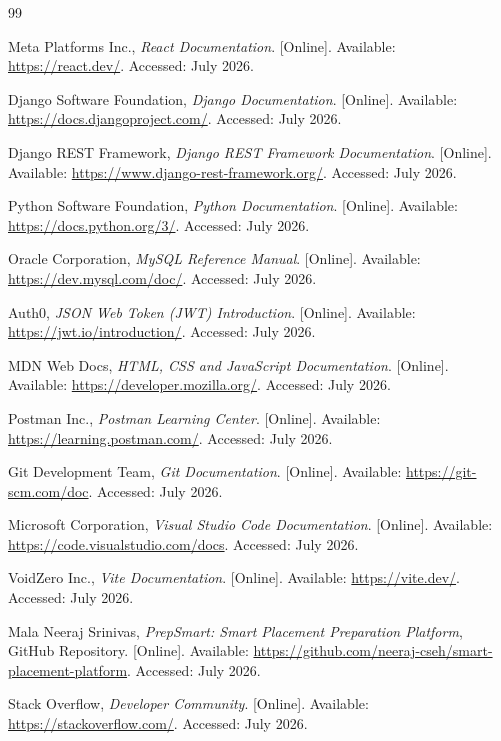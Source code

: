 \begin{thebibliography}{99}

Meta Platforms Inc., \emph{React Documentation}. [Online]. Available: \url{https://react.dev/}. Accessed: July 2026.

Django Software Foundation, \emph{Django Documentation}. [Online]. Available: \url{https://docs.djangoproject.com/}. Accessed: July 2026.

Django REST Framework, \emph{Django REST Framework Documentation}. [Online]. Available: \url{https://www.django-rest-framework.org/}. Accessed: July 2026.

Python Software Foundation, \emph{Python Documentation}. [Online]. Available: \url{https://docs.python.org/3/}. Accessed: July 2026.

Oracle Corporation, \emph{MySQL Reference Manual}. [Online]. Available: \url{https://dev.mysql.com/doc/}. Accessed: July 2026.

Auth0, \emph{JSON Web Token (JWT) Introduction}. [Online]. Available: \url{https://jwt.io/introduction/}. Accessed: July 2026.

MDN Web Docs, \emph{HTML, CSS and JavaScript Documentation}. [Online]. Available: \url{https://developer.mozilla.org/}. Accessed: July 2026.

Postman Inc., \emph{Postman Learning Center}. [Online]. Available: \url{https://learning.postman.com/}. Accessed: July 2026.

Git Development Team, \emph{Git Documentation}. [Online]. Available: \url{https://git-scm.com/doc}. Accessed: July 2026.

Microsoft Corporation, \emph{Visual Studio Code Documentation}. [Online]. Available: \url{https://code.visualstudio.com/docs}. Accessed: July 2026.

VoidZero Inc., \emph{Vite Documentation}. [Online]. Available: \url{https://vite.dev/}. Accessed: July 2026.

Mala Neeraj Srinivas, \emph{PrepSmart: Smart Placement Preparation Platform}, GitHub Repository. [Online]. Available: \url{https://github.com/neeraj-cseh/smart-placement-platform}. Accessed: July 2026.

Stack Overflow, \emph{Developer Community}. [Online]. Available: \url{https://stackoverflow.com/}. Accessed: July 2026.


\end{thebibliography}
